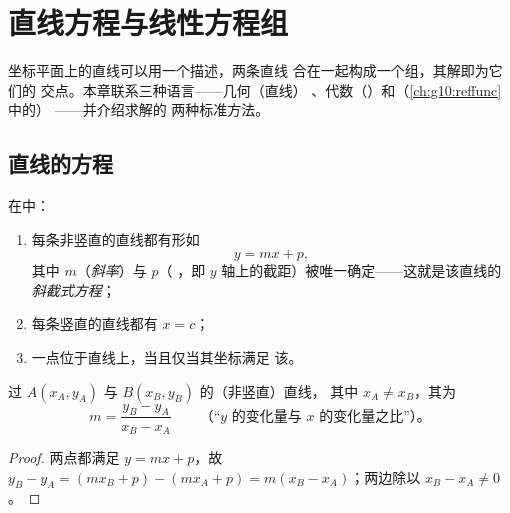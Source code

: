 \chapter{直线方程与线性方程组}\label{ch:g10:lines}

坐标平面上的直线可以用一个描述，两条直线
合在一起构成一个组，其解即为它们的
交点。本章联系三种语言——几何（直线）
、代数（）和（\cref{ch:g10:reffunc}中的）
——并介绍求解的
两种标准方法。

\section{直线的方程}

\begin{theorem}[斜截式方程]\label{thm:g10:lines:reduced}
在中：
\begin{enumerate}
  \item 每条非竖直的直线都有形如
        \[
        y = mx + p ,
        \]
        其中 $m$（\emph{斜率}）与 $p$（
        \emph{}，即 $y$ 轴上的截距）被唯一确定——这就是该直线的
        \emph{斜截式方程}；
  \item 每条竖直的直线都有 $x = c$；
  \item 一点位于直线上，当且仅当其坐标满足
        该。
\end{enumerate}
\end{theorem}
\admitted

\begin{proposition}[过两点的斜率]\label{prop:g10:lines:slope}
过 $A(x_A, y_A)$ 与 $B(x_B, y_B)$ 的（非竖直）直线，
其中 $x_A \neq x_B$，其为
\[
m = \frac{y_B - y_A}{x_B - x_A}
\qquad
\text{（“$y$ 的变化量与 $x$ 的变化量之比”）。}
\]
\end{proposition}

\begin{proof}
两点都满足 $y = mx + p$，故 $y_B - y_A = (mx_B + p) - (mx_A + p)
= m(x_B - x_A)$；两边除以 $x_B - x_A \neq 0$。
\end{proof}

